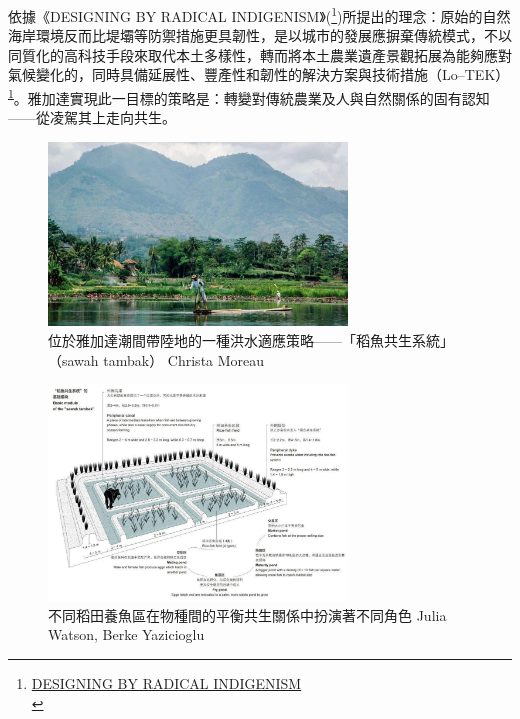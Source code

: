 \documentclass[a4paper,12pt]{article}
\begin{document}
依據《DESIGNING BY RADICAL INDIGENISM》(\footnote{\href{http://113.31.19.9/Qikan/Article/Detail?id=7102610394\&from=Qikan\_Search\_Index}{DESIGNING BY RADICAL INDIGENISM}\\\label{org705a100}})所提出的理念：原始的自然海岸環境反而比堤壩等防禦措施更具韌性，是以城市的發展應摒棄傳統模式，不以同質化的高科技手段來取代本土多樣性，轉而將本土農業遺產景觀拓展為能夠應對氣候變化的，同時具備延展性、豐產性和韌性的解決方案與技術措施（Lo–TEK）\textsuperscript{\ref{org705a100}}。雅加達實現此一目標的策略是：轉變對傳統農業及人與自然關係的固有認知——從凌駕其上走向共生。\\
\begin{figure}[htbp]
\centering
\includegraphics[width=300]{images/oOKotHMBeElxlkka9awL.jpg}
\caption{\label{fig:yd-1}位於雅加達潮間帶陸地的一種洪水適應策略——「稻魚共生系統」（sawah tambak） Christa Moreau}
\end{figure}

\begin{figure}[htbp]
\centering
\includegraphics[width=300]{images/ouKotHMBeElxlkka-6wF.jpg}
\caption{\label{fig:yd-2}不同稻田養魚區在物種間的平衡共生關係中扮演著不同角色 Julia Watson, Berke Yazicioglu}
\end{figure}
\end{document}
